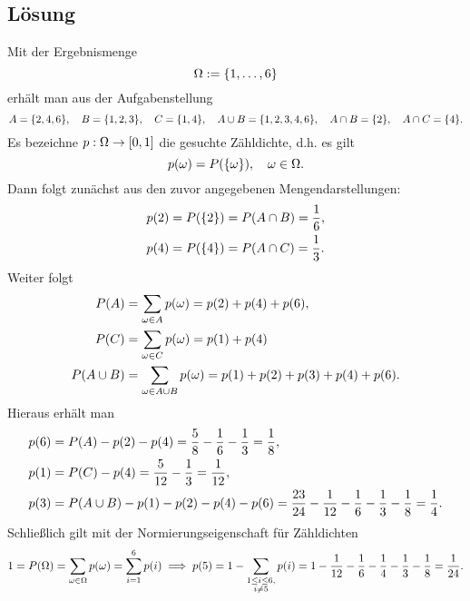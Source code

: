\documentclass{exercise}
\begin{document}
    \subsection*{Lösung}
    Mit der Ergebnismenge
    \[
        \Omega := \braces*{1, \ldots, 6}
    \]
    erhält man aus der Aufgabenstellung
    \[
        A = \braces*{2, 4, 6}, \quad B = \braces*{1, 2, 3}, \quad C = \braces*{1, 4}, \quad A \cup B = \braces*{1, 2, 3, 4, 6}, \quad A \cap B = \braces*{2}, \quad A \cap C = \braces*{4}.
    \]
    Es bezeichne \(p: \Omega \to \brackets*{0, 1}\) die gesuchte Zähldichte, d.h. es gilt
    \[
        p\parentheses*{\omega} = P\parentheses*{\braces*{\omega}}, \quad \omega \in \Omega.
    \]
    Dann folgt zunächst aus den zuvor angegebenen Mengendarstellungen:
    \begin{align*}
        p\parentheses*{2} &= P\parentheses*{\braces*{2}} = P\parentheses*{A \cap B} = \frac{1}{6},\\
        p\parentheses*{4} &= P\parentheses*{\braces*{4}} = P\parentheses*{A \cap C} = \frac{1}{3}.
    \end{align*}
    Weiter folgt
    \begin{align*}
        P\parentheses*{A} &= \sum_{\omega \in A}p\parentheses*{\omega} = p\parentheses*{2} + p\parentheses*{4} + p\parentheses*{6},\\
        P\parentheses*{C} &= \sum_{\omega \in C}p\parentheses*{\omega} = p\parentheses*{1} + p\parentheses*{4}\\
        P\parentheses*{A \cup B} &= \sum_{\omega \in A \cup B}p\parentheses*{\omega} = p\parentheses*{1} + p\parentheses*{2} + p\parentheses*{3} + p\parentheses*{4} + p\parentheses*{6}.
    \end{align*}
    Hieraus erhält man
    \begin{align*}
        p\parentheses*{6} &= P\parentheses*{A} - p\parentheses*{2} - p\parentheses*{4} = \frac{5}{8} - \frac{1}{6} - \frac{1}{3} = \frac{1}{8},\\
        p\parentheses*{1} &= P\parentheses*{C} - p\parentheses*{4} = \frac{5}{12} - \frac{1}{3} = \frac{1}{12},\\
        p\parentheses*{3} &= P\parentheses*{A \cup B} - p\parentheses*{1} - p\parentheses*{2} - p\parentheses*{4} - p\parentheses*{6} = \frac{23}{24} - \frac{1}{12} - \frac{1}{6} - \frac{1}{3} - \frac{1}{8} = \frac{1}{4}.
    \end{align*}
    Schließlich gilt mit der Normierungseigenschaft für Zähldichten
    \[
        1 = P\parentheses*{\Omega} = \sum_{\omega \in \Omega}p\parentheses*{\omega} = \sum_{i = 1}^6 p\parentheses*{i} \implies p\parentheses*{5} = 1 - \sum_{\substack{1 \le i \le 6,\\i \ne 5}} p\parentheses*{i} = 1 - \frac{1}{12} - \frac{1}{6} - \frac{1}{4} - \frac{1}{3} - \frac{1}{8} = \frac{1}{24}.
    \]
\end{document}
